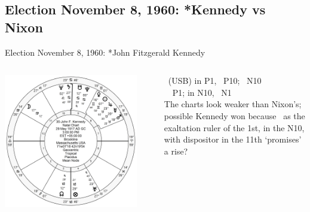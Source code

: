 \subsection{Election November 8, 1960: *Kennedy vs Nixon}
\begin{frame}[t]{Election November 8, 1960: *John Fitzgerald Kennedy}
\small

\begin{columns}[T, onlytextwidth]
\vspace{-1em}
{\includegraphics[width=0.9\textwidth]{charts/JFK.png}}
\fontsize{7pt}{8pt}\selectfont

\Venus\, (USB) in P1, \Square\, P10; \Sextile\, N10 \\
\Saturn\, \Sextile\, P1; in N10, \Square\, N1 \\
\vspace{0.5em}
The charts look weaker than Nixon's; possible Kennedy won because \Saturn\, as the exaltation ruler of the 1st, in the N10, with dispositor in the 11th `promises' a rise?



\end{columns}
\end{frame}
